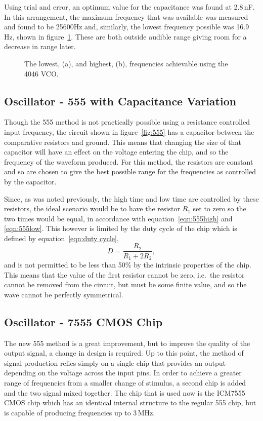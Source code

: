 Using trial and error, an optimum value for the capacitance was found at 2.8\,nF. In this arrangement, the maximum frequency that was available was measured and found to be 25600Hz and, similarly, the lowest frequency possible was 16.9\,Hz, shown in figure~\ref{fig:4046_high_low}. These are both outside audible range giving room for a decrease in range later. 

\begin{figure}[htbp]
	\centering
		 
		\caption{The lowest, (a), and highest, (b), frequencies achievable using the 4046 VCO.}
		\label{fig:4046_high_low}
\end{figure}

\subsection{Oscillator - 555 with Capacitance Variation}
\label{sec:555capacitor}
Though the 555 method is not practically possible using a resistance controlled input frequency, the circuit shown in figure~\ref{fig:555} has a capacitor between the comparative resistors and ground. This means that changing the size of that capacitor will have an effect on the voltage entering the chip, and so the frequency of the waveform produced. For this method, the resistors are constant and so are chosen to give the best possible range for the frequencies as controlled by the capacitor.

Since, as was noted previously, the high time and low time are controlled by these resistors, the ideal scenario would be to have the resistor $R_1$ set to zero so the two times would be equal, in accordance with equation~\ref{eqn:555high} and \ref{eqn:555low}. This however is limited by the duty cycle of the chip which is defined by equation~\ref{eqn:duty cycle},
\begin{equation}
	D = \frac{R_2}{R_1 + 2R_2},
	\label{eqn:duty cycle}
\end{equation}
and is not permitted to be less than 50\% by the intrinsic properties of the chip. This means that the value of the first resistor cannot be zero, i.e.\ the resistor cannot be removed from the circuit, but must be some finite value, and so the wave cannot be perfectly symmetrical.

\subsection{Oscillator - 7555 CMOS Chip}
\label{sec:7555}
The new 555 method is a great improvement, but to improve the quality of the output signal, a change in design is required. Up to this point, the method of signal production relies simply on a single chip that provides an output depending on the voltage across the input pins. In order to achieve a greater range of frequencies from a smaller change of stimulus, a second chip is added and the two signal mixed together. The chip that is used now is the ICM7555 CMOS chip which has an identical internal structure to the regular 555 chip, but is capable of producing frequencies up to 3\,MHz\cite{CMOS-7555}.

